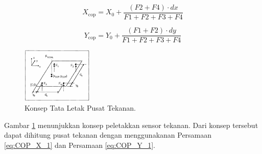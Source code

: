 \begin{enumerate}[label=\Alph*.]
    \begin{equation}
      X_{\mathrm{cop}} = X_0 + \frac{(F2 + F4) \cdot dx}{F1 + F2 + F3 + F4}
      \label{eq:COP_X_1}
    \end{equation}

    \begin{equation}
      Y_{\mathrm{cop}} = Y_0 + \frac{(F1 + F2) \cdot dy}{F1 + F2 + F3 + F4}
      \label{eq:COP_Y_1}
    \end{equation}


    \begin{figure} [h] \centering
      \includegraphics[width=0.3\textwidth]{gambar/Konsep_Letak.png}
      \caption{Konsep Tata Letak Pusat Tekanan\cite{resna2005}.}
      \label{fig:Konsep_Letak}
    \end{figure}

    \hspace*{1em} Gambar \ref{fig:Konsep_Letak} menunjukkan konsep peletakkan sensor tekanan. Dari konsep tersebut dapat dihitung pusat tekanan dengan menggunakanan Persamaan \ref{eq:COP_X_1} dan Persamaan \ref{eq:COP_Y_1}.
\end{enumerate}